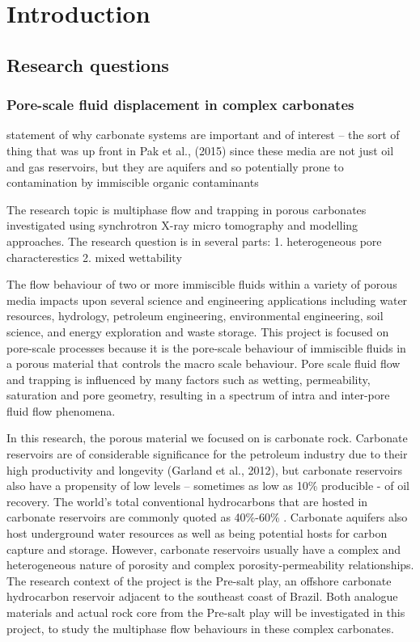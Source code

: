 \chapter{Introduction}
\section{Research questions}
\subsection{Pore-scale fluid displacement in complex carbonates}
statement of why carbonate systems are important and of interest – the sort of thing that was up front in Pak et al., (2015) since these media are not just oil and gas reservoirs, but they are aquifers and so potentially prone to contamination by immiscible organic contaminants 

The research topic is multiphase flow and trapping in porous carbonates investigated using synchrotron X-ray micro tomography and modelling approaches. The research question is in several parts:
1. heterogeneous pore characterestics
2. mixed wettability

The flow behaviour of two or more immiscible fluids within a variety of porous media impacts upon several science and engineering applications including water resources, hydrology, petroleum engineering, environmental engineering, soil science, and energy exploration and waste storage. This project is focused on pore-scale processes because it is the pore-scale behaviour of immiscible fluids in a porous material that controls the macro scale behaviour. Pore scale fluid flow and trapping is influenced by many factors such as wetting, permeability, saturation and pore geometry, resulting in a spectrum of intra and inter-pore fluid flow phenomena. 

In this research, the porous material we focused on is carbonate rock. Carbonate reservoirs are of considerable significance for the petroleum industry due to their high productivity and longevity (Garland et al., 2012), but carbonate reservoirs also have a propensity of low levels – sometimes as low as 10\% producible - of oil recovery. The world’s total conventional hydrocarbons that are hosted in carbonate reservoirs are commonly quoted as 40\%-60\% \citep{garland2012advances,ningning2014distribution}. Carbonate aquifers also host underground water resources as well as being potential hosts for carbon capture and storage. However, carbonate reservoirs usually have a complex and heterogeneous nature of porosity and complex porosity-permeability relationships. The research context of the project is the Pre-salt play, an offshore carbonate hydrocarbon reservoir adjacent to the southeast coast of Brazil. Both analogue materials and actual rock core from the Pre-salt play will be investigated in this project, to study the multiphase flow behaviours in these complex carbonates.

